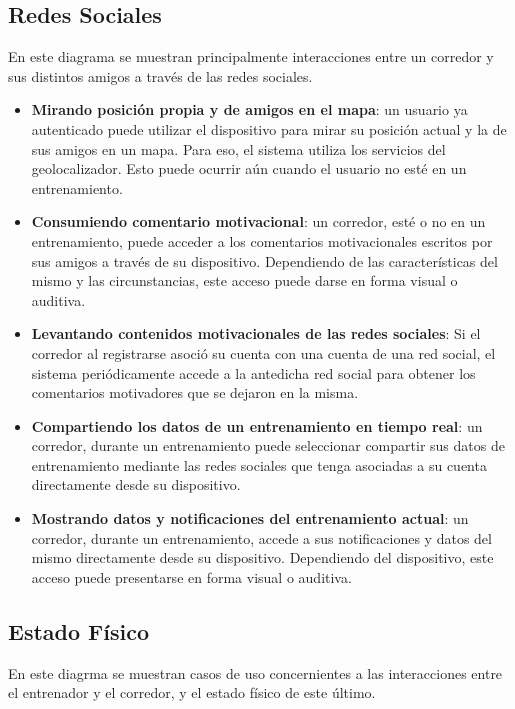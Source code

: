\subsection{Redes Sociales}
En este diagrama se muestran principalmente interacciones entre un corredor y sus distintos amigos a través de las redes sociales.

\begin{itemize}
	\item \textbf{Mirando posición propia y de amigos en el mapa}: un usuario ya autenticado puede utilizar el dispositivo para mirar su posición actual y la de sus amigos en un mapa. Para eso, el sistema utiliza los servicios del geolocalizador. Esto puede ocurrir aún cuando el usuario no esté en un entrenamiento.
	\item \textbf{Consumiendo comentario motivacional}: un corredor, esté o no en un entrenamiento, puede acceder a los comentarios motivacionales escritos por sus amigos a través de su dispositivo. Dependiendo de las características del mismo y las circunstancias, este acceso puede darse en forma visual o auditiva.
\item \textbf{Levantando contenidos motivacionales de las redes sociales}: Si el corredor al registrarse asoció su cuenta con una cuenta de una red social, el sistema periódicamente accede a la antedicha red social para obtener los comentarios motivadores que se dejaron en la misma. 
	\item \textbf{Compartiendo los datos de un entrenamiento en tiempo real}: un corredor, durante un entrenamiento puede seleccionar compartir sus datos de entrenamiento mediante las redes sociales que tenga asociadas a su cuenta directamente desde su dispositivo.
	\item \textbf{Mostrando datos y notificaciones del entrenamiento actual}: un corredor, durante un entrenamiento, accede a sus notificaciones y datos del mismo directamente desde su dispositivo. Dependiendo del dispositivo, este acceso puede presentarse en forma visual o auditiva.
\end{itemize}


\subsection{Estado Físico}
En este diagrma se muestran casos de uso concernientes a las interacciones entre el entrenador y el corredor, y el estado físico de este último.

